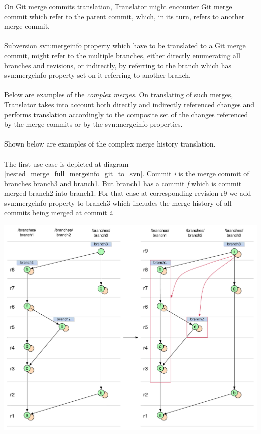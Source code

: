 On Git merge commits translation, Translator might encounter Git merge commit which refer to the parent commit, which,
in its turn, refers to another merge commit.
\\\\
Subversion svn:mergeinfo property which have to be translated to a Git merge commit, might refer to the multiple branches,
either directly enumerating all branches and revisions, or indirectly, by referring to the branch which has svn:mergeinfo property set on it referring to another branch.
\\\\
Below are examples of the \emph{complex merges}. On translating of such merges, Translator takes into account both
directly and indirectly referenced changes and performs translation accordingly to the composite set of the 
changes referenced by the merge commits or by the svn:mergeinfo properties.
\\\\
Shown below are examples of the complex merge history translation.
\\\\
The first use case is depicted at diagram \ref{nested_merge_full_mergeinfo_git_to_svn}. 
Commit \emph{i} is the merge commit of branches branch3 and branch1. 
But branch1 has a commit \emph{f} which is commit merged branch2 into branch1. 
For that case at corresponding revision r9 we add svn:mergeinfo property to branch3 which includes the merge history of all commits being merged at commit \emph{i}.

\begin{center}
\includegraphics[width=\textwidth]{img/diagrams/nested_merge_full_mergeinfo_git_to_svn.pdf}%
\label{nested_merge_full_mergeinfo_git_to_svn}%
\end{center}


